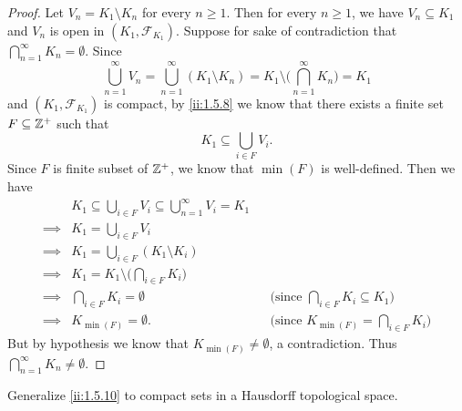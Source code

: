 \begin{proof}
  Let \(V_n = K_1 \setminus K_n\) for every \(n \geq 1\).
  Then for every \(n \geq 1\), we have \(V_n \subseteq K_1\) and \(V_n\) is open in \((K_1, \mathcal{F}_{K_1})\).
  Suppose for sake of contradiction that \(\bigcap_{n = 1}^\infty K_n = \emptyset\).
  Since
  \[
    \bigcup_{n = 1}^\infty V_n = \bigcup_{n = 1}^\infty (K_1 \setminus K_n) = K_1 \setminus \bigg(\bigcap_{n = 1}^\infty K_n\bigg) = K_1
  \]
  and \((K_1, \mathcal{F}_{K_1})\) is compact, by \cref{ii:1.5.8} we know that there exists a finite set \(F \subseteq \mathbb{Z}^+\) such that
  \[
    K_1 \subseteq \bigcup_{i \in F} V_i.
  \]
  Since \(F\) is finite subset of \(\mathbb{Z}^+\), we know that \(\min(F)\) is well-defined.
  Then we have
  \begin{align*}
             & K_1 \subseteq \bigcup_{i \in F} V_i \subseteq \bigcup_{n = 1}^\infty V_i = K_1                                                             \\
    \implies & K_1 = \bigcup_{i \in F} V_i                                                                                                                \\
    \implies & K_1 = \bigcup_{i \in F} (K_1 \setminus K_i)                                                                                                \\
    \implies & K_1 = K_1 \setminus \bigg(\bigcap_{i \in F} K_i\bigg)                                                                                      \\
    \implies & \bigcap_{i \in F} K_i = \emptyset                                              &  & \text{(since \(\bigcap_{i \in F} K_i \subseteq K_1)\)} \\
    \implies & K_{\min(F)} = \emptyset.                                                       &  & \text{(since \(K_{\min(F)} = \bigcap_{i \in F} K_i)\)}
  \end{align*}
  But by hypothesis we know that \(K_{\min(F)} \neq \emptyset\), a contradiction.
  Thus \(\bigcap_{n = 1}^\infty K_n \neq \emptyset\).
\end{proof}

\begin{ex}\label{ii:ex:2.5.14}
  Generalize \cref{ii:1.5.10} to compact sets in a Hausdorff topological space.
\end{ex}

